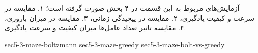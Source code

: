 آزمایش‌های مربوط به این قسمت در ۴ بخش صورت گرفته است؛ ۱. مقایسه در سرعت و کیفیت یادگیری، ۲. مقایسه در پیچیدگی زمانی، ۳. مقایسه در میزان باروری، ۴. مقایسه تاثیر تعداد عامل‌ها میزان کیفیت و سرعت یادگیری.

{sec5-3-maze-boltzmann}
{sec5-3-maze-greedy}
{sec5-3-maze-bolt-vs-greedy}